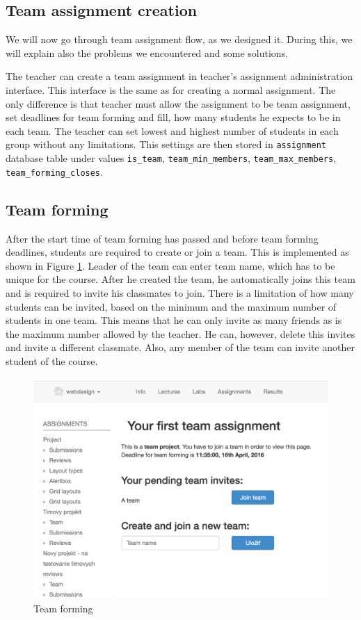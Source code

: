 \subsection{Team assignment creation}
We will now go through team assignment flow, as we designed it. During this, we will explain also the problems we encountered and some solutions.

The teacher can create a team assignment in teacher's assignment administration interface. This interface is the same as for creating a normal assignment. The only difference is that teacher must allow the assignment to be team assignment, set deadlines for team forming and fill, how many students he expects to be in each team. The teacher can set lowest and highest number of students in each group without any limitations. This settings are then stored in \texttt{assignment} database table under values \texttt{is\_team}, \texttt{team\_min\_members}, \texttt{team\_max\_members}, \texttt{team\_forming\_closes}.

\subsection{Team forming}
After the start time of team forming has passed and before team forming deadlines, students are required to create or join a team. This is implemented as shown in Figure \ref{team_forming}. Leader of the team can enter team name, which has to be unique for the course. After he created the team, he automatically joins this team and is required to invite his classmates to join. There is a limitation of how many students can be invited, based on the minimum and the maximum number of students in one team. This means that he can only invite as many friends as is the maximum number allowed by the teacher. He can, however, delete this invites and invite a different classmate. Also, any member of the team can invite another student of the course.

\begin{figure}[h]
    \centering
    \includegraphics[width=\textwidth]{images/teamforming.png}
    \caption{Team forming}
    \label{team_forming}
\end{figure}

